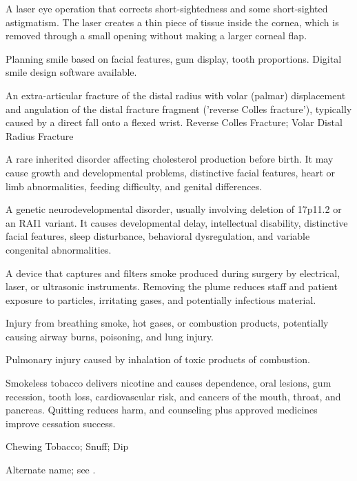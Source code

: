  A laser eye operation that corrects short-sightedness and some short-sighted astigmatism. The laser creates a thin piece of tissue inside the cornea, which is removed through a small opening without making a larger corneal flap.

 Planning smile based on facial features, gum display, tooth proportions. Digital smile design software available.

 An extra-articular fracture of the distal radius with volar (palmar) displacement and angulation of the distal fracture fragment ('reverse Colles fracture'), typically caused by a direct fall onto a flexed wrist.
\synonyms
Reverse Colles Fracture; Volar Distal Radius Fracture

 A rare inherited disorder affecting cholesterol production before birth. It may cause growth and developmental problems, distinctive facial features, heart or limb abnormalities, feeding difficulty, and genital differences.

 A genetic neurodevelopmental disorder, usually involving deletion of 17p11.2 or an RAI1
variant. It causes developmental delay, intellectual disability, distinctive facial
features, sleep disturbance, behavioral dysregulation, and variable congenital
abnormalities.

 A device that captures and filters smoke produced during surgery by electrical, laser, or ultrasonic instruments. Removing the plume reduces staff and patient exposure to particles, irritating gases, and potentially infectious material.

 Injury from breathing smoke, hot gases, or combustion products, potentially causing airway burns, poisoning, and lung injury.

 Pulmonary injury caused by inhalation of toxic products of combustion.

 Smokeless tobacco delivers nicotine and causes dependence, oral lesions, gum recession, tooth loss, cardiovascular risk, and cancers of the mouth, throat, and pancreas. Quitting reduces harm, and counseling plus approved medicines improve cessation success.

\synonyms
Chewing Tobacco; Snuff; Dip

 Alternate name; see .

